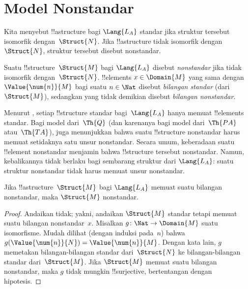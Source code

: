 \documentclass[../../../include/open-logic-section]{subfiles}
\begin{document}
\section{Model Nonstandar}

\begin{explain}
Kita menyebut !!a{structure} bagi $\Lang{L_A}$ standar jika struktur tersebut
isomorfik dengan~$\Struct{N}$. Jika !!a{structure} tidak isomorfik dengan
$\Struct{N}$, struktur tersebut disebut nonstandar.
\end{explain}

\begin{defn}
Suatu !!{structure}~$\Struct{M}$ bagi $\Lang{L_A}$ disebut
\emph{nonstandar} jika tidak isomorfik dengan~$\Struct{N}$. !!{element}s
$x \in \Domain{M}$ yang sama dengan $\Value{\num{n}}{M}$ bagi suatu
$n \in \Nat$ disebut \emph{bilangan standar} (dari $\Struct{M}$), sedangkan
yang tidak demikian disebut \emph{bilangan nonstandar}.
\end{defn}

\begin{explain}
Menurut , setiap !!{structure} standar
bagi~$\Lang{L_A}$ hanya memuat !!{element}s standar. Bagi model dari~$\Th{Q}$
(dan karenanya bagi model dari~$\Th{PA}$ atau~$\Th{TA}$),
 juga menunjukkan bahwa suatu !!{structure}
nonstandar harus memuat setidaknya satu unsur nonstandar. Secara umum,
keberadaan suatu !!{element} nonstandar menjamin bahwa !!{structure} tersebut
nonstandar. Namun, kebalikannya tidak berlaku bagi sembarang struktur dari
$\Lang{L_A}$: suatu struktur nonstandar tidak harus memuat unsur nonstandar.
\end{explain}

\begin{prop}
Jika !!a{structure}~$\Struct{M}$ bagi $\Lang{L_A}$ memuat suatu bilangan
nonstandar, maka $\Struct{M}$ nonstandar.
\end{prop}

\begin{proof}
Andaikan tidak; yakni, andaikan $\Struct{M}$ standar tetapi memuat suatu
bilangan nonstandar~$x$. Misalkan $g\colon \Nat \to \Domain{M}$ suatu
isomorfisme. Mudah dilihat (dengan induksi pada~$n$) bahwa
$g(\Value{\num{n}}{N}) = \Value{\num{n}}{M}$. Dengan kata lain, $g$ memetakan
bilangan-bilangan standar dari~$\Struct{N}$ ke bilangan-bilangan standar
dari~$\Struct{M}$. Jika $\Struct{M}$ memuat suatu bilangan nonstandar, maka
$g$ tidak mungkin !!{surjective}, bertentangan dengan hipotesis.
\end{proof}
\end{document}
